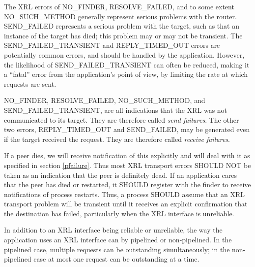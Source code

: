 \documentclass[11pt]{article}
\makeatletter
\newcommand{\finder} {{\em Finder}\@\xspace}
\makeatother
\begin{document}
%
%

The XRL errors of NO\_FINDER, RESOLVE\_FAILED, and to some extent
NO\_SUCH\_METHOD generally represent serious problems with the router.
SEND\_FAILED represents a serious problem with the target, such as
that an instance of the target has died; this problem may or may not
be transient. The SEND\_FAILED\_TRANSIENT and REPLY\_TIMED\_OUT errors
are
potentially common errors, and should be handled by the
application. However, the likelihood of SEND\_FAILED\_TRANSIENT can
often be reduced, making it a ``fatal'' error from the application's
point of view, by limiting the rate at which requests are sent.

NO\_FINDER, RESOLVE\_FAILED, NO\_SUCH\_METHOD, and
SEND\_FAILED\_TRANSIENT, are all indications that the XRL was not
communicated to its target. They are therefore called \emph{send
failures}.  The other two errors, REPLY\_TIMED\_OUT and SEND\_FAILED,
may be generated even if the target received the request. They are
therefore called \emph{receive failures}.

If a peer dies, we will receive notification of this explicitly and
will deal with it as specified in section \ref{pfailure}. Thus most
XRL transport errors SHOULD NOT be taken as an indication that the
peer is definitely dead. If an application cares that the peer has
died or restarted, it SHOULD register with the finder to receive
notifications of process restarts. Thus, a process SHOULD assume that
an XRL transport problem will be transient until it receives an
explicit confirmation that the destination has failed, particularly
when the XRL interface is unreliable.

In addition to an XRL interface being reliable or unreliable, the way
the application uses an XRL interface can by pipelined or
non-pipelined.  In the pipelined case, multiple requests can be
outstanding simultaneously; in the non-pipelined case at most one
request can be outstanding at a time.
\end{document}
